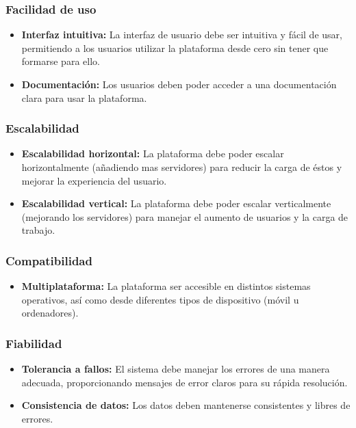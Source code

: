 \subsubsection{Facilidad de uso}
\begin{itemize}
    \item \textbf{Interfaz intuitiva:} La interfaz de usuario debe ser intuitiva y fácil de usar, permitiendo a los usuarios utilizar la plataforma desde cero sin tener que formarse para ello.
    
    \item \textbf{Documentación:} Los usuarios deben poder acceder a una documentación clara para usar la plataforma.
    
\end{itemize}

\subsubsection{Escalabilidad}
\begin{itemize}
    \item \textbf{Escalabilidad horizontal:} La plataforma debe poder escalar horizontalmente (añadiendo mas servidores) para reducir la carga de éstos y mejorar la experiencia del usuario.
    
    \item \textbf{Escalabilidad vertical:} La plataforma debe poder escalar verticalmente (mejorando los servidores) para manejar el aumento de usuarios y la carga de trabajo.
    
\end{itemize}

\subsubsection{Compatibilidad}
\begin{itemize}
    \item \textbf{Multiplataforma:} La plataforma ser accesible en distintos sistemas operativos, así como desde diferentes tipos de dispositivo (móvil u ordenadores).
    
\end{itemize}

\subsubsection{Fiabilidad}
\begin{itemize}
    \item \textbf{Tolerancia a fallos:} El sistema debe manejar los errores de una manera adecuada, proporcionando mensajes de error claros para su rápida resolución.
    
    \item \textbf{Consistencia de datos:} Los datos deben mantenerse consistentes y libres de errores.
    
\end{itemize}

